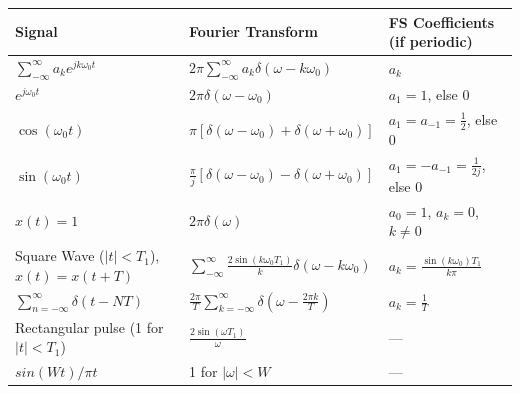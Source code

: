 \documentclass[8pt]{extarticle}
\begin{document}
\begin{table}[h]
    \centering
    \begin{tabular}{|l|l|l|}
        \hline
        \textbf{Signal}                                            & \textbf{Fourier Transform}                                                         & \textbf{FS Coefficients (if periodic)}    \\ \hline
        $\sum_{-\infty}^{\infty} a_k e^{j k \omega_0 t}$           & $2\pi \sum_{-\infty}^{\infty} a_k \delta(\omega - k\omega_0)$                      & $a_k$                                     \\ \hline
        $e^{j\omega_0 t}$                                          & $2\pi \delta(\omega - \omega_0)$                                                   & $a_1 = 1$, else 0                         \\ \hline
        $\cos(\omega_0 t)$                                         & $\pi[\delta(\omega - \omega_0) + \delta(\omega + \omega_0)]$                       & $a_1 = a_{-1} = \frac{1}{2}$, else 0      \\ \hline
        $\sin(\omega_0 t)$                                         & $\frac{\pi}{j}[\delta(\omega - \omega_0) - \delta(\omega + \omega_0)]$             & $a_1 = -a_{-1} = \frac{1}{2j}$, else 0    \\ \hline
        $x(t) = 1$                                                 & $2\pi \delta(\omega)$                                                              & $a_0 = 1$, $a_k = 0$, $k \neq 0$          \\ \hline
        Square Wave  ($|t|<T_1$), $x(t)=x(t+T)$                    & $\sum_{-\infty}^{\infty} \frac{2\sin(k\omega_0 T_1)}{k}\delta(\omega - k\omega_0)$ & $a_k = \frac{\sin(k \omega_0) T_1}{k\pi}$ \\ \hline
        $\sum_{n=-\infty}^{\infty} \delta(t-NT)$                   & $\frac{2\pi}{T}\sum_{k=-\infty}^{\infty}\delta(\omega-\frac{2\pi  k}{T})$          & $a_k = \frac{1}{T}$                       \\ \hline
        Rectangular pulse  (1 for $|t|<T_1$)                       & $\frac{2 \sin(\omega T_1)}{\omega}$                                                & —                                         \\ \hline
        $sin(Wt)/\pi t$                                            & 1 for $|\omega|<W$                                                                 & —                                         \\ \hline

\end{tabular}
\end{table}
\end{document}

